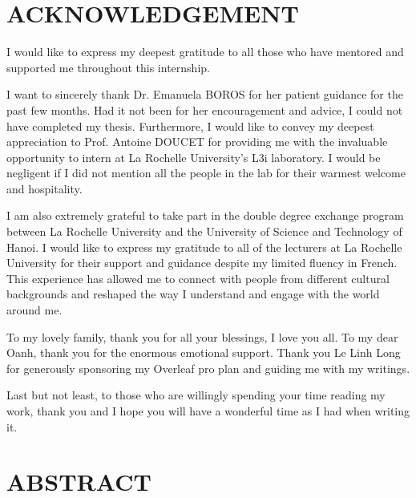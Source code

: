 \documentclass[11pt]{extarticle}
\begin{document}
\pagestyle{fancy} %

\tableofcontents
\newpage

\setlength{\parindent}{0pt}
\setlength{\parskip}{1em}
\newpage


\section*{ACKNOWLEDGEMENT}

I would like to express my deepest gratitude to all those who have mentored and supported me throughout this internship.

I want to sincerely thank Dr. Emanuela BOROS for her patient guidance for the past few months. Had it not been for her encouragement and advice, I could not have completed my thesis. Furthermore, I would like to convey my deepest appreciation to Prof. Antoine DOUCET for providing me with the invaluable opportunity to intern at La Rochelle University's L3i laboratory. I would be negligent if I did not mention all the people in the lab for their warmest welcome and hospitality.

I am also extremely grateful to take part in the double degree exchange program between La Rochelle University and the University of Science and Technology of Hanoi. I would like to express my gratitude to all of the lecturers at La Rochelle University for their support and guidance despite my limited fluency in French. This experience has allowed me to connect with people from different cultural backgrounds and reshaped the way I understand and engage with the world around me.

To my lovely family, thank you for all your blessings, I love you all. To my dear Oanh, thank you for the enormous emotional support. Thank you Le Linh Long for generously sponsoring my Overleaf pro plan and guiding me with my writings.

Last but not least, to those who are willingly spending your time reading my work, thank you and I hope you will have a wonderful time as I had when writing it.

\newpage

\section*{ABSTRACT}
\end{document}
